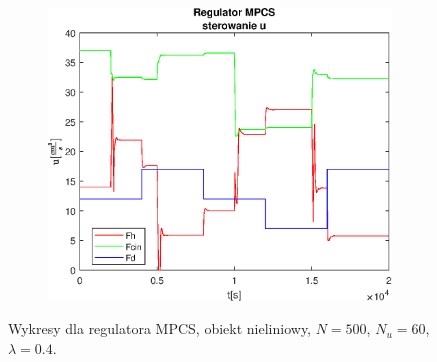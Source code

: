 \begin{figure}[h!]
   \begin{subfigure}[b]{0.4\textwidth}
      \includegraphics[width=1\linewidth]{img/MPCSanaRK/distMPCSRKControlN500Nu60l40.eps}
      \caption{}
      \label{fig:fig:distMPCSRKN500Nu60l403}
   \end{subfigure}
       
   \caption{Wykresy dla regulatora MPCS, obiekt nieliniowy, $N = 500$, $N_u = 60$, $\lambda = 0.4$.}
   \label{fig:distMPCSRKN500Nu60l40}
\end{figure}
           
